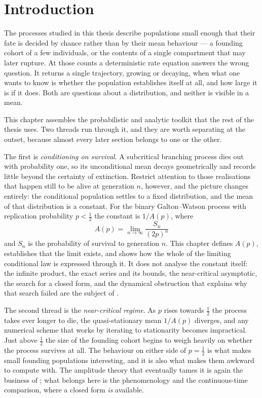 \section{Introduction}
\label{m:sec:intro}

The processes studied in this thesis describe populations small enough that their
fate is decided by chance rather than by their mean behaviour --- a founding cohort
of a few individuals, or the contents of a single compartment that may later
rupture. At those counts a deterministic rate equation answers the wrong question.
It returns a single trajectory, growing or decaying, when what one wants to know is
whether the population establishes itself at all, and how large it is if it does.
Both are questions about a distribution, and neither is visible in a mean.

This chapter assembles the probabilistic and analytic toolkit that the rest of the
thesis uses. Two threads run through it, and they are worth separating at the
outset, because almost every later section belongs to one or the other.

The first is \emph{conditioning on survival}. A subcritical branching process dies
out with probability one, so its unconditional mean decays geometrically and
records little beyond the certainty of extinction. Restrict attention to those
realisations that happen still to be alive at generation $n$, however, and the
picture changes entirely: the conditional population settles to a fixed
distribution, and the mean of that distribution is a constant. For the binary
Galton--Watson process with replication probability $p<\tfrac12$ the constant is
$1/A(p)$, where
\begin{equation*}
A(p) = \lim_{n\to\infty}\frac{S_n}{(2p)^n}
\end{equation*}
and $S_n$ is the probability of survival to generation $n$. This chapter defines
$A(p)$, establishes that the limit exists, and shows how the whole of the limiting
conditional law is expressed through it. It does not analyse the constant itself:
the infinite product, the exact series and its bounds, the near-critical
asymptotic, the search for a closed form, and the dynamical obstruction that
explains why that search failed are the subject of \ChA.

The second thread is the \emph{near-critical regime}. As $p$ rises towards
$\tfrac12$ the process takes ever longer to die, the quasi-stationary mean $1/A(p)$
diverges, and any numerical scheme that works by iterating to stationarity becomes
impractical. Just above $\tfrac12$ the size of the founding cohort begins to weigh
heavily on whether the process survives at all. The behaviour on either side of
$p=\tfrac12$ is what makes small founding populations interesting, and it is also
what makes them awkward to compute with. The amplitude theory that eventually
tames it is again the business of \ChA; what belongs here is the phenomenology and
the continuous-time comparison, where a closed form \emph{is} available.

